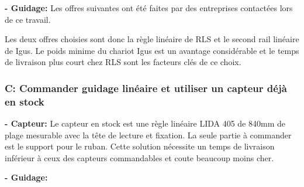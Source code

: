 \textbf{ - Guidage:}
\newline
Les offres suivantes ont été faites par des entreprises contactées lors de ce travail.

\begin{table}[H]
  \centering
  \caption{Offres pour le guidage}
  \label{tab:OffreGuid1}
\end{table}

Les deux offres choisies sont donc la règle linéaire de RLS et le second rail linéaire de Igus. Le poids minime du chariot Igus est un avantage considérable
et le temps de livraison plus court chez RLS sont les facteurs clés de ce choix.

\subsubsection{C: Commander guidage linéaire et utiliser un capteur déjà en stock}
\textbf{ - Capteur:}
\newline
Le capteur en stock est une règle linéaire LIDA 405 de 840mm de plage mesurable avec la tête de lecture et fixation. La seule partie à commander
est le support pour le ruban. Cette solution nécessite un temps de livraison inférieur à ceux des capteurs commandables et coute beaucoup moins cher.

\textbf{ - Guidage:}
\newline

